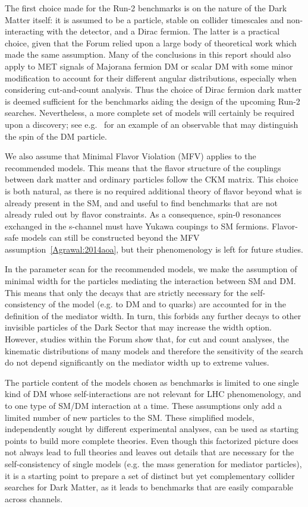 The first choice made for the Run-2 benchmarks is on the nature of the
Dark Matter itself: it is assumed to be a particle, stable on collider
timescales and non-interacting with the detector, and a Dirac fermion.
The latter is a practical choice, given that the Forum relied upon a large body of theoretical work which made the same assumption. Many of the conclusions in this
report should also apply to MET signals of Majorana fermion DM or
scalar DM with some minor modification to account for their different
angular distributions, especially when considering cut-and-count
analysis. Thus the choice of Dirac fermion dark matter is deemed
sufficient for the benchmarks aiding the design of the upcoming Run-2
searches. Nevertheless, a more complete set of models will certainly
be required upon a discovery; see e.g.~\cite{Crivellin:2015wva} for an
example of an observable that may distinguish the spin of the DM
particle.

We also assume that Minimal Flavor Violation (MFV) applies 
to the recommended models. This means that 
the flavor structure of the couplings between dark matter and ordinary particles
follow the CKM matrix. This choice is both natural, as there is no required 
additional theory of flavor beyond what is already present in the SM, and 
and useful to find benchmarks that are not already ruled out by flavor constraints. 
As a consequence, spin-0 resonances exchanged in the s-channel 
must have Yukawa coupings to SM fermions. Flavor-safe models can still 
be constructed beyond the MFV assumption~\ref{Agrawal:2014aoa},
but their phenomenology is left for future studies. 

In the parameter scan for the recommended models, we make the assumption
of minimal width for the particles mediating the interaction between SM and DM. 
This means that only the decays that are strictly necessary for the self-consistency of the model (e.g.
to DM and to quarks) are accounted for in the definition of the mediator width. In turn,
this forbids any further decays to other invisible particles of the Dark Sector that may increase
the width option. However,  studies within the Forum show that, 
for cut and count analyses, the kinematic distributions of many models and therefore the sensitivity of the search
do not depend significantly on the mediator width up to extreme values.  

The particle content of the models chosen as benchmarks is limited to one single kind of DM
whose self-interactions are not relevant for LHC phenomenology, and to one type of 
SM/DM interaction at a time. These assumptions only add a limited number of new particles
to the SM. These simplified models, independently sought by different experimental analyses,
can be used as starting points to build more complete theories. Even though 
this factorized picture does not always lead to full theories and leaves out details that are necessary
for the self-consistency of single models (e.g. the mass generation for mediator particles), 
it is a starting point to prepare a set of distinct but yet complementary collider searches for Dark Matter, 
as it leads to benchmarks that are easily comparable across channels. 
